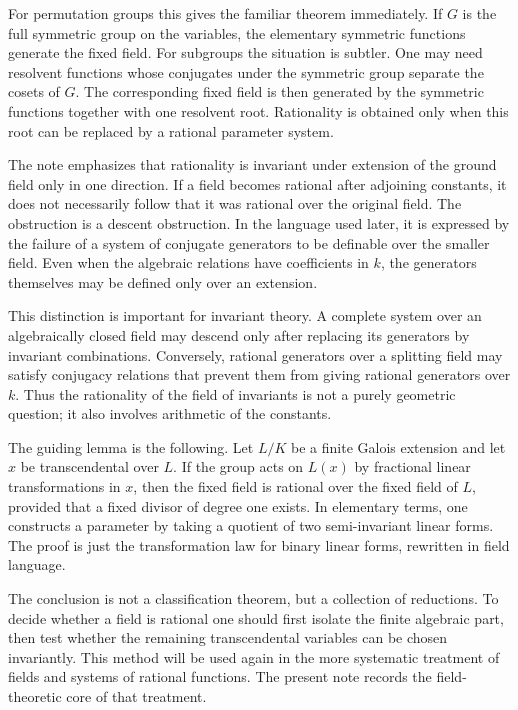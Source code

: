 \documentclass[12pt]{article}
\begin{document}
For permutation groups this gives the familiar theorem immediately. If \(G\) is the full symmetric
group on the variables, the elementary symmetric functions generate the fixed field. For subgroups
the situation is subtler. One may need resolvent functions whose conjugates under the symmetric
group separate the cosets of \(G\). The corresponding fixed field is then generated by the symmetric
functions together with one resolvent root. Rationality is obtained only when this root can be
replaced by a rational parameter system.


The note emphasizes that rationality is invariant under extension of the ground field only in one
direction. If a field becomes rational after adjoining constants, it does not necessarily follow
that it was rational over the original field. The obstruction is a descent obstruction. In the
language used later, it is expressed by the failure of a system of conjugate generators to be
definable over the smaller field. Even when the algebraic relations have coefficients in \(k\), the
generators themselves may be defined only over an extension.


This distinction is important for invariant theory. A complete system over an algebraically closed
field may descend only after replacing its generators by invariant combinations. Conversely,
rational generators over a splitting field may satisfy conjugacy relations that prevent them from
giving rational generators over \(k\). Thus the rationality of the field of invariants is not a
purely geometric question; it also involves arithmetic of the constants.


The guiding lemma is the following. Let \(L/K\) be a finite Galois extension and let \(x\) be
transcendental over \(L\). If the group acts on \(L(x)\) by fractional linear transformations in
\(x\), then the fixed field is rational over the fixed field of \(L\), provided that a fixed divisor
of degree one exists. In elementary terms, one constructs a parameter by taking a quotient of two
semi-invariant linear forms. The proof is just the transformation law for binary linear forms,
rewritten in field language.


The conclusion is not a classification theorem, but a collection of reductions. To decide whether a
field is rational one should first isolate the finite algebraic part, then test whether the
remaining transcendental variables can be chosen invariantly. This method will be used again in the
more systematic treatment of fields and systems of rational functions. The present note records the
field-theoretic core of that treatment.
\end{document}
